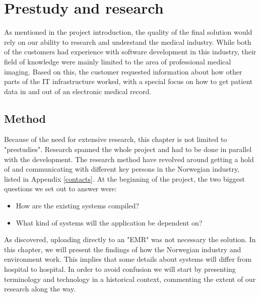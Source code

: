 \section{Prestudy and research}
As mentioned in the project introduction, the quality of the final solution would rely on our ability to research and understand the medical industry. While both of the customers had experience with software development in this industry, their field of knowledge were mainly limited to the area of professional medical imaging. Based on this, the customer requested information about how other parts of the IT infrastructure worked, with a special focus on how to get patient data in and out of an electronic medical record. 

\subsection{Method}
Because of the need for extensive research, this chapter is not limited to "prestudies". Research spanned the whole project and had to be done in parallel with the development. The research method have revolved around getting a hold of and communicating with different key persons in the Norwegian industry, listed in Appendix \ref{contacts}. At the beginning of the project, the two biggest questions we set out to answer were: 

\begin{itemize}
\item How are the existing systems compiled?
\item What kind of systems will the application be dependent on?
\end{itemize}

As discovered, uploading directly to an "EMR" was not necessary the solution. In this chapter, we will present the findings of how the Norwegian industry and environment work. This implies that some details about systems will differ from hospital to hospital. In order to avoid confusion we will start by presenting terminology and technology in a historical context, commenting the extent of our research along the way.

